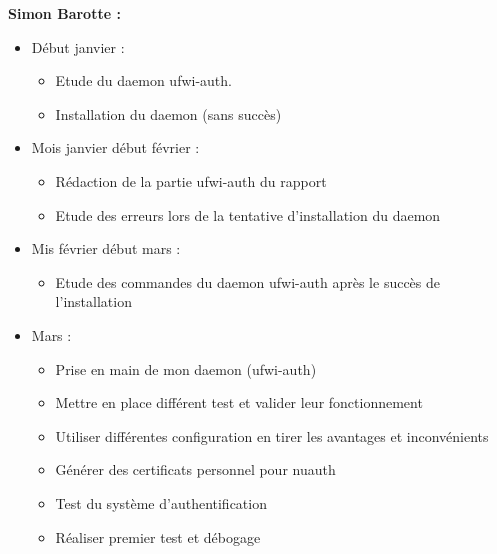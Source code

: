 \documentclass[12pt]{report}
\begin{document}
\begin{itemize}
\textbf{Simon Barotte :}
\begin{itemize}
  \item Début janvier :
  \begin{itemize}
    \item Etude du daemon ufwi-auth.
    \item Installation du daemon (sans succès)
  \end{itemize}
  \item Mois janvier début février :
  \begin{itemize}
    \item Rédaction de la partie ufwi-auth du rapport
    \item Etude des erreurs lors de la tentative d'installation du daemon
  \end{itemize}
  \item Mis février début mars :
  \begin{itemize}
    \item Etude des commandes du daemon ufwi-auth après le succès de l'installation
  \end{itemize}
  \item Mars :
  \begin{itemize}
    \item Prise en main de mon daemon (ufwi-auth)
	  \item Mettre en place différent test et valider leur fonctionnement
	  \item Utiliser différentes configuration en tirer les avantages et inconvénients
	  \item Générer des certificats personnel pour nuauth	
	  \item Test du système d'authentification
	  \item Réaliser premier test et débogage
  \end{itemize}
\end{itemize}
	

\end{itemize}
\end{document}
